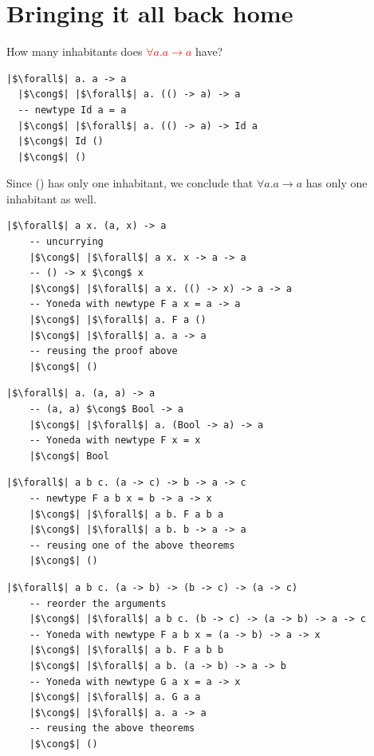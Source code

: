 \documentclass[tikz]{beamer}
\newcommand{\mred}[1]{\textcolor{red}{$#1$}}
\theoremstyle{definition}
\begin{document}
\section{Bringing it all back home}


\frame
{
	How many inhabitants does \mred{\forall a. a \to a} have? 
}

\begin{frame}[fragile]

\begin{verbatim}
|$\forall$| a. a -> a
  |$\cong$| |$\forall$| a. (() -> a) -> a
  -- newtype Id a = a
  |$\cong$| |$\forall$| a. (() -> a) -> Id a
  |$\cong$| Id ()
  |$\cong$| ()
\end{verbatim}
Since () has only one inhabitant, we conclude that $\forall a. a \to a$ has only one inhabitant as well.
\end{frame}

\begin{frame}[fragile]
\begin{verbatim}
|$\forall$| a x. (a, x) -> a
    -- uncurrying
    |$\cong$| |$\forall$| a x. x -> a -> a
    -- () -> x $\cong$ x
    |$\cong$| |$\forall$| a x. (() -> x) -> a -> a
    -- Yoneda with newtype F a x = a -> a
    |$\cong$| |$\forall$| a. F a ()
    |$\cong$| |$\forall$| a. a -> a
    -- reusing the proof above
    |$\cong$| ()
\end{verbatim}
\end{frame}


\begin{frame}[fragile]
\begin{verbatim}
|$\forall$| a. (a, a) -> a
    -- (a, a) $\cong$ Bool -> a
    |$\cong$| |$\forall$| a. (Bool -> a) -> a
    -- Yoneda with newtype F x = x
    |$\cong$| Bool
\end{verbatim}
\end{frame}

\begin{frame}[fragile]
\begin{verbatim}
|$\forall$| a b c. (a -> c) -> b -> a -> c
    -- newtype F a b x = b -> a -> x
    |$\cong$| |$\forall$| a b. F a b a
    |$\cong$| |$\forall$| a b. b -> a -> a
    -- reusing one of the above theorems
    |$\cong$| ()
\end{verbatim}
\end{frame}

\begin{frame}[fragile]
\begin{verbatim}
|$\forall$| a b c. (a -> b) -> (b -> c) -> (a -> c)
    -- reorder the arguments
    |$\cong$| |$\forall$| a b c. (b -> c) -> (a -> b) -> a -> c
    -- Yoneda with newtype F a b x = (a -> b) -> a -> x
    |$\cong$| |$\forall$| a b. F a b b
    |$\cong$| |$\forall$| a b. (a -> b) -> a -> b
    -- Yoneda with newtype G a x = a -> x
    |$\cong$| |$\forall$| a. G a a
    |$\cong$| |$\forall$| a. a -> a
    -- reusing the above theorems
    |$\cong$| ()
\end{verbatim}
\end{frame}
\end{document}
